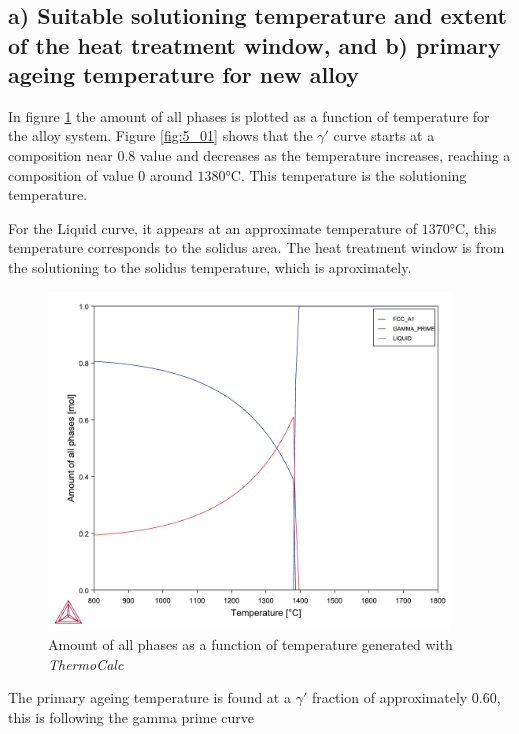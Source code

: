 \section{}

\subsection{a) Suitable solutioning temperature and extent of the heat treatment window, and b) primary ageing temperature for new alloy}

In figure \ref{fig:diagram05} the amount of all phases is plotted as a function of temperature for the alloy system. Figure \ref{fig:5_01} shows that the $\gamma'$ curve starts at a composition near $0.8$ value and decreases as the temperature increases, reaching a composition of value $0$ around $1380$°C. This temperature is the solutioning temperature. 

For the Liquid curve, it appears at an approximate temperature of $1370$°C, this temperature corresponds to the solidus area. 
The heat treatment window is from the solutioning to the solidus temperature, which is aproximately.

\begin{figure}[h]
  \centering
    \includegraphics[width=0.95\textwidth]{graficas/Q4_02.pdf}
    \caption{Amount of all phases as a function of temperature generated with \textit{ThermoCalc} \citep{thermocalc}}
    \label{fig:diagram05}
\end{figure}

The primary ageing temperature is found at a $\gamma'$ fraction of approximately 0.60, this is following the gamma prime curve 


